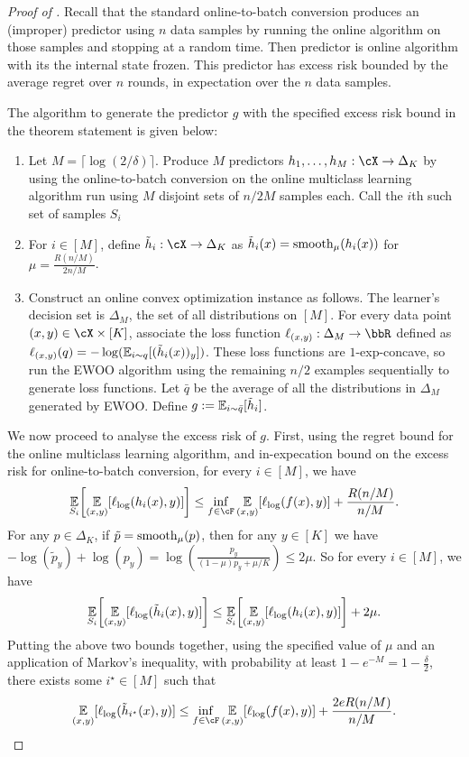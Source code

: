 \begin{proof}[Proof of ]
Recall that the standard online-to-batch conversion \citep{helmboldwarmuth} produces an (improper) predictor using $n$ data samples by running the online algorithm on those samples and stopping at a random time. Then predictor is online algorithm with its the internal state frozen. This predictor has excess risk bounded by the average regret over $n$ rounds, in expectation over the $n$ data samples.

The algorithm to generate the predictor $g$ with the specified excess risk bound in the theorem statement is given below:
\begin{enumerate}
\item Let $M=\lceil\log(2/\delta)\rceil$. Produce $M$ predictors $h_{1},\ldots,h_{M}: \cX \rightarrow \Delta_K$ by using the online-to-batch conversion on the online multiclass learning algorithm run using $M$ disjoint sets of $n/2M$ samples each. Call the $i$th such set of samples $S_{i}$
\item For $i \in [M]$, define $\tilde{h}_{i}: \cX \rightarrow \Delta_K$ as $\tilde{h}_i(x) = \smooth\prn*{h_i(x)}$ for $\mu = \frac{R(n/M)}{2n/M}$.
\item Construct an online convex optimization instance as follows. The learner's decision set is $\Delta_M$, the set of all distributions on $[M]$. For every data point $(x, y) \in \cX \times [K]$, associate the loss function $\ls_{(x, y)}: \Delta_M \rightarrow \R$ defined as $\ell_{(x, y)}(q) = -\log(\operatorname*{\mathbb{E}}_{i \sim q}[(\tilde{h}_{i}(x))_y])$. These loss functions are $1$-exp-concave, so run the EWOO algorithm \citep{hazan2007logarithmic} using the remaining $n/2$ examples sequentially to generate loss functions. Let $\bar{q}$ be the average of all the distributions in $\Delta_M$ generated by EWOO. Define $g := \operatorname*{\mathbb{E}}_{i \sim \bar{q}}[\tilde{h}_i]$.
\end{enumerate}

We now proceed to analyse the excess risk of $g$. First, using the regret bound for the online multiclass learning algorithm, and in-expecation bound on the excess risk for online-to-batch conversion, for every $i \in [M]$, we have 
\[ \En_{S_i}\brk*{\En_{(x, y)}[\ls_\text{log}(h_i(x), y)]} \leq \inf_{f \in \cF} \En_{(x, y)}[\ls_\text{log}(f(x), y)] + \frac{R(n/M)}{n/M}.\]
For any $p \in \Delta_K$, if $\tilde{p} = \mathrm{smooth}_{\mu}(p)$, then for any $y \in [K]$ we have $-\log(\tilde{p}_y) + \log(p_y) = \log(\frac{p_y}{(1-\mu)p_y + \mu/K}) \leq 2\mu$. So for every $i \in [M]$, we have
\[ \En_{S_i}\brk*{\En_{(x, y)}[\ls_\text{log}(\tilde{h}_i(x), y)]} \leq \En_{S_i}\brk*{\En_{(x, y)}[\ls_\text{log}(h_i(x), y)]} + 2\mu.\]
Putting the above two bounds together, using the specified value of $\mu$ and an application of Markov's inequality, with probability at least $1 - e^{-M} = 1 - \frac{\delta}{2}$, there exists some $i^\star \in [M]$ such that
\begin{equation} \label{eq:markov}
	\En_{(x, y)}[\ls_\text{log}(\tilde{h}_{i^\star}(x), y)] \leq \inf_{f \in \cF} \En_{(x, y)}[\ls_\text{log}(f(x), y)] + \frac{2eR(n/M)}{n/M}.
\end{equation}



\end{proof}
